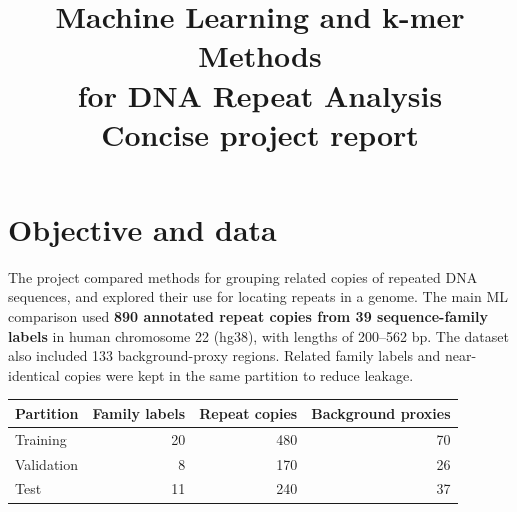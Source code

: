 \documentclass[10pt,a4paper]{article}
\title{\vspace{-1.5em}\textbf{Machine Learning and k-mer Methods\\for DNA Repeat Analysis}\\[0.3em]\large Concise project report}
\author{}\date{}
\begin{document}
\maketitle\vspace{-3em}

\section*{Objective and data}
The project compared methods for grouping related copies of repeated DNA sequences, and explored their use for locating repeats in a genome. The main ML comparison used \textbf{890 annotated repeat copies from 39 sequence-family labels} in human chromosome 22 (hg38), with lengths of 200--562 bp. The dataset also included 133 background-proxy regions. Related family labels and near-identical copies were kept in the same partition to reduce leakage.

\begin{center}\small
\begin{tabular}{@{}lrrr@{}}
\toprule
Partition & Family labels & Repeat copies & Background proxies\\
\midrule
Training & 20 & 480 & 70\\
Validation & 8 & 170 & 26\\
Test & 11 & 240 & 37\\
\bottomrule
\end{tabular}
\end{center}
\end{document}
